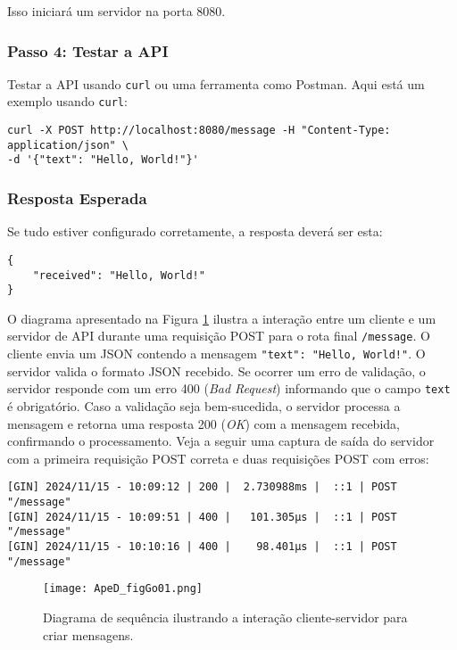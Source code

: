 Isso iniciará um servidor na porta 8080.

\subsubsection{Passo 4: Testar a API}

Testar a API usando \texttt{curl} ou uma ferramenta como Postman. Aqui está um exemplo usando \texttt{curl}:

\begin{verbatim}
curl -X POST http://localhost:8080/message -H "Content-Type: application/json" \
-d '{"text": "Hello, World!"}'
\end{verbatim}

\subsubsection{Resposta Esperada}

Se tudo estiver configurado corretamente, a resposta deverá ser esta:

\begin{verbatim}
{
    "received": "Hello, World!"
}
\end{verbatim}

O diagrama apresentado na Figura \ref{fig:figGo01} ilustra a interação entre um cliente e um servidor de API durante uma requisição POST para o rota final \texttt{/message}. O cliente envia um JSON contendo a mensagem \texttt{"text": "Hello, World!"}. O servidor valida o formato JSON recebido. Se ocorrer um erro de validação, o servidor responde com um erro 400 (\textit{Bad Request}) informando que o campo \texttt{text} é obrigatório. Caso a validação seja bem-sucedida, o servidor processa a mensagem e retorna uma resposta 200 (\textit{OK}) com a mensagem recebida, confirmando o processamento. Veja a seguir uma captura de saída do servidor com a primeira requisição POST correta e duas requisições POST com erros:

\begin{verbatim}
[GIN] 2024/11/15 - 10:09:12 | 200 |  2.730988ms |  ::1 | POST  "/message"
[GIN] 2024/11/15 - 10:09:51 | 400 |   101.305µs |  ::1 | POST  "/message"
[GIN] 2024/11/15 - 10:10:16 | 400 |    98.401µs |  ::1 | POST  "/message"
\end{verbatim}
    

\begin{figure}[!ht]
    \centering
    \texttt{[image: ApeD\_figGo01.png]}
    \caption{Diagrama de sequência ilustrando a interação cliente-servidor para criar mensagens.}
    \label{fig:figGo01}
\end{figure}

